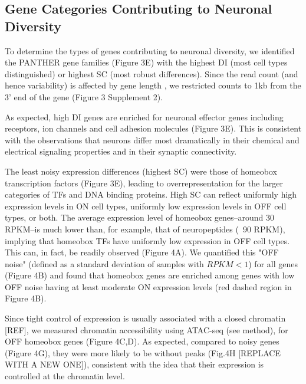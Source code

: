 \subsection{Gene Categories Contributing to Neuronal Diversity}

To determine the types of genes contributing to neuronal diversity, we identified the PANTHER gene families (Figure 3E) with the highest DI (most cell types distinguished) or highest SC (most robust differences). Since the read count (and hence variability) is affected by gene length \cite{Oshlack_2009}, we restricted counts to 1kb from the 3' end of the gene (Figure 3 Supplement 2). 

As expected, high DI genes are enriched for neuronal effector genes including receptors, ion channels and cell adhesion molecules (Figure 3E). This is consistent with the observations that neurons differ most dramatically in their chemical and electrical signaling properties and in their synaptic connectivity.

The least noisy expression differences (highest SC) were those of homeobox transcription factors (Figure 3E), leading to overrepresentation for the larger categories of TFs and DNA binding proteins. High SC can reflect uniformly high expression levels in ON cell types, uniformly low expression levels in OFF cell types, or both. The average expression level of homeobox genes--around 30 RPKM--is much lower than, for example, that of  neuropeptides (~90 RPKM), implying that homeobox TFs have uniformly low expression in OFF cell types. This can, in fact, be readily observed (Figure 4A). We quantified this "OFF noise" (defined as a standard deviation of samples with $RPKM<1$) for all genes (Figure 4B) and found that homeobox genes are enriched among genes with low OFF noise having at least moderate ON expression levels (red dashed region in Figure 4B).

Since tight control of expression is usually associated with a closed chromatin [REF], we measured chromatin accessibility using ATAC-seq (see method), for OFF homeobox genes (Figure 4C,D). As expected, compared to noisy genes (Figure 4G), they were more likely to be without peaks (Fig.4H [REPLACE WITH A NEW ONE]), consistent with the idea that their expression is controlled at the chromatin level.


